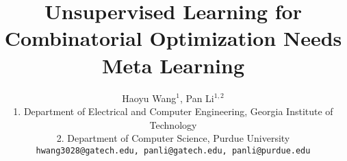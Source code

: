 \documentclass{article} %
\title{Unsupervised Learning for Combinatorial Optimization Needs Meta Learning}
\author{Haoyu Wang$^{1}$, Pan Li$^{1,2}$ \\
1. Department of Electrical and Computer Engineering, Georgia Institute of Technology \\
2. Department of Computer Science, Purdue University\\
\texttt{hwang3028@gatech.edu, panli@gatech.edu, panli@purdue.edu} \\
}
\newcommand{\pan}[1]{\textcolor{blue}{P:#1}}
\begin{document}
\maketitle




\begin{abstract}%


\end{abstract}
\end{document}
